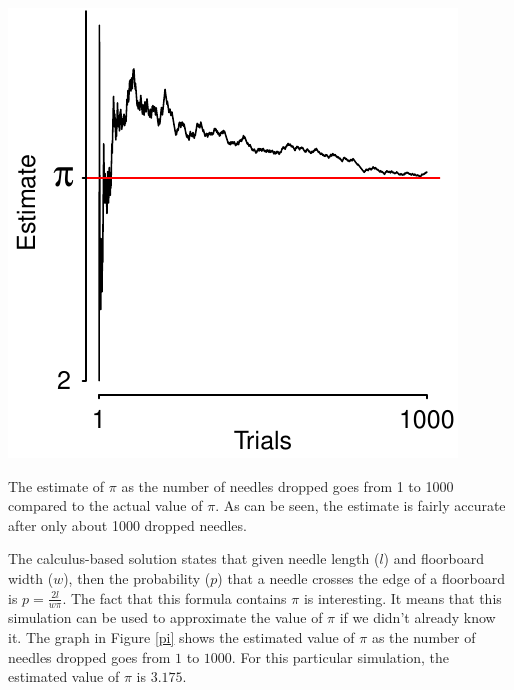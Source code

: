\documentclass{tufte-handout}
\begin{document}
\begin{marginfigure}[.3in]
  \includegraphics[width=\linewidth]{./graphics/pi.pdf}
  \caption{The estimate of $\pi$ as the number of needles dropped goes from 1 to 1000 compared to the actual value of $\pi$. As can be seen, the estimate is fairly accurate after only about 1000 dropped needles.}
  \label{pi}
\end{marginfigure}

The calculus-based solution states that given needle length ($l$) and floorboard width ($w$), then the probability ($p$) that a needle crosses the edge of a floorboard is $ p=\frac{2l}{w\pi}$. The fact that this formula contains $\pi$ is interesting. It means that this simulation can be used to approximate the value of $\pi$ if we didn't already know it. The graph in Figure \ref{pi} shows the estimated value of $\pi$ as the number of needles dropped goes from $1$ to $1000$. For this particular simulation, the estimated value of $\pi$ is $3.175$.
\end{document}
